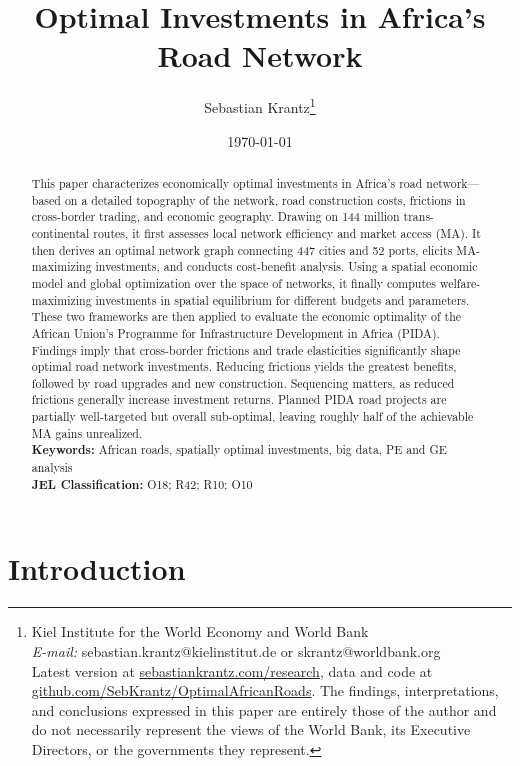 \documentclass[a4paper]{article}
\title{\textbf{Optimal Investments in Africa's Road Network}} \author{Sebastian Krantz\footnote{Kiel Institute for the World Economy and World Bank \\ \textit{E-mail:} sebastian.krantz@kielinstitut.de or skrantz@worldbank.org\\ Latest version at \href{https://sebastiankrantz.com/research.html}{sebastiankrantz.com/research}, data and code at \href{https://github.com/SebKrantz/OptimalAfricanRoads}{github.com/SebKrantz/OptimalAfricanRoads}. The findings, interpretations, and conclusions expressed in this paper are entirely those of the author and do not necessarily represent the views of the World Bank, its Executive Directors, or the governments they represent.}}
\date{\today}
\begin{document}
\maketitle
\begin{abstract}


This paper characterizes economically optimal investments in Africa's road network---based on a detailed topography of the network, road construction costs, frictions in cross-border trading, and economic geography. Drawing on 144 million trans-continental routes, it first assesses local network efficiency and market access (MA). It then derives an optimal network graph connecting 447 cities and 52 ports, elicits MA-maximizing investments, and conducts cost-benefit analysis. Using a spatial economic model and global optimization over the space of networks, it finally computes welfare-maximizing investments in spatial equilibrium for different budgets and parameters. These two frameworks are then applied to evaluate the economic optimality of the African Union's Programme for Infrastructure Development in Africa (PIDA). Findings imply that cross-border frictions and trade elasticities significantly shape optimal road network investments. Reducing frictions yields the greatest benefits, followed by road upgrades and new construction. Sequencing matters, as reduced frictions generally increase investment returns. Planned PIDA road projects are partially well-targeted but overall sub-optimal, leaving roughly half of the achievable MA gains unrealized.
\\ [0.7em]
\noindent \textbf{Keywords:} African roads, spatially optimal investments, big data, PE and GE analysis\\
\textbf{JEL Classification:} O18; R42; R10; O10
\end{abstract}


\section{Introduction}
\end{document}
